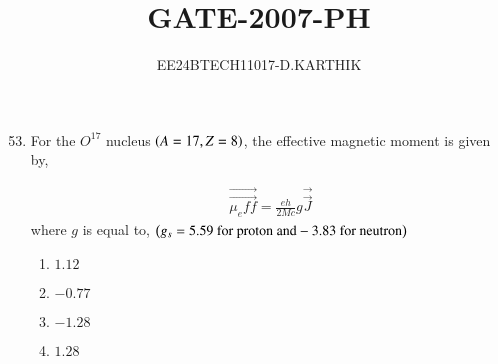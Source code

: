 \documentclass[journal]{IEEEtran}
\begin{document}

\vspace{3cm}

\title{GATE-2007-PH}
\author{EE24BTECH11017-D.KARTHIK}
\maketitle

\renewcommand{\thefigure}{\theenumi}
\renewcommand{\thetable}{\theenumi}
\setlength{\intextsep}{10pt}


\renewcommand{\thetable}{\theenumi}

\begin{enumerate}
    \setcounter{enumi}{52}
    \item For the $O^{17}$ nucleus $\left(A = 17, Z=8\right)$, the effective magnetic moment is given by, 
    
    \begin{align}
        \Vec{\overrightarrow{\mu_eff}} = \frac{eh}{2Mc}g\Vec{\overrightarrow{J}}
    \end{align}
    where $g$ is equal to, $\left(g_s = 5.59 \text{ for proton and} -3.83 \text{ for neutron}\right)$
    \begin{multicols}{4}
    \begin{enumerate}
    
        \item $1.12$ 
        \item $-0.77$ 
        \item $-1.28$ 
        \item $1.28$ 
    \end{enumerate}
    \end{multicols}

\end{enumerate}
\end{document}
